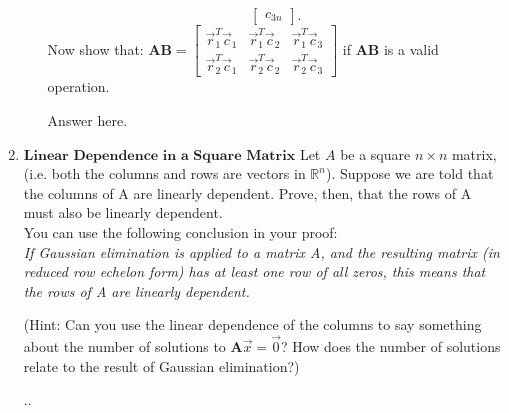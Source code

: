 \documentclass[11pt]{article}
\def\R{\mathbb{R}} %
\def\A{\textbf{A}} %
\def\AB{\textbf{AB}}
\begin{document}
\begin{enumerate}
\begin{enumerate}
\[\begin{bmatrix}
                                    c_{3n}
                        \end{bmatrix}.
                \]
                Now show that:
$\AB = \begin{bmatrix}
    \vec r_1^T \vec c_1 & \vec r_1^T \vec c_2 & \vec r_1^T \vec c_3 \\
    \vec r_2^T \vec c_1 & \vec r_2^T \vec c_2 & \vec r_2^T \vec c_3
\end{bmatrix}$ if $\AB$ is a valid operation.
        \begin{Answer}
            Answer here.
        \end{Answer}
       \end{enumerate}
   
   \newpage
   \item $\textbf{Linear Dependence in a Square Matrix}$
   Let $A$ be a square $n\times n$ matrix, (i.e. both the columns and rows are vectors in $\R^n$). Suppose we are told that the columns of A are linearly dependent. Prove, then, that the rows of A must also be linearly dependent.
   \\
    You can use the following conclusion in your proof:
    \\
    \textit{If Gaussian elimination is applied to a matrix A, and the resulting matrix (in reduced row echelon form) has at least one row of all zeros, this means that the rows of A are linearly dependent.}
    
    (Hint: Can you use the linear dependence of the columns to say something about the number of solutions
    to $\A\vec x =\vec 0$? How does the number of solutions relate to the result of Gaussian elimination?)
    \begin{Answer}
        ..
    \end{Answer}


\end{enumerate}
\end{document}
